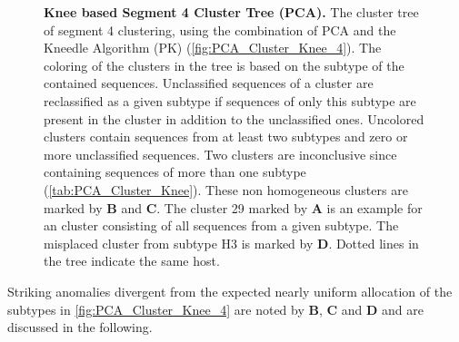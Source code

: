 \begin{figure}[!hbt]
    \caption[Knee based Segment 4 Cluster Tree (\Acrshort{PCA})]{\textbf{Knee based Segment 4 Cluster Tree (\Acrshort{PCA}).} The cluster tree of segment 4 clustering, using the combination of \gls{PCA} and the Kneedle Algorithm (PK) (\autoref{fig:PCA_Cluster_Knee_4}). The coloring of the clusters in the tree is based on the subtype of the contained sequences. Unclassified sequences of a cluster are reclassified as a given subtype if sequences of only this subtype are present in the cluster in addition to the unclassified ones. Uncolored clusters contain sequences from at least two subtypes and zero or more unclassified sequences. Two clusters are inconclusive since containing sequences of more than one subtype (\autoref{tab:PCA_Cluster_Knee}). These non homogeneous clusters are marked by \textbf{\textsf{B}} and \textbf{\textsf{C}}. The cluster 29 marked by \textbf{\textsf{A}} is an example for an cluster consisting of all sequences from a given subtype. The misplaced cluster from subtype H3 is marked by \textbf{\textsf{D}}. Dotted lines in the tree indicate the same host.}
    \label{fig:PCA_Clusteree_Knee_4}
\end{figure}

Striking anomalies divergent from the expected nearly uniform allocation of the subtypes in \autoref{fig:PCA_Cluster_Knee_4} are noted by \textbf{\textsf{B}}, \textbf{\textsf{C}} and \textbf{\textsf{D}} and are discussed in the following. 